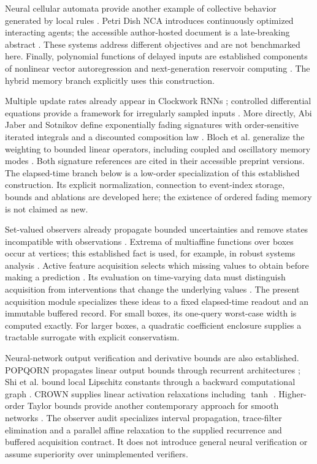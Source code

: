 \documentclass[11pt,a4paper]{article}
\theoremstyle{definition}\newtheorem{definition}[theorem]{Definition}
\begin{document}
Neural cellular automata provide another example of collective behavior generated by local rules \cite{mordvintsev2020}. Petri Dish NCA introduces continuously optimized interacting agents; the accessible author-hosted document is a late-breaking abstract \cite{zhang2025}. These systems address different objectives and are not benchmarked here. Finally, polynomial functions of delayed inputs are established components of nonlinear vector autoregression and next-generation reservoir computing \cite{gauthier2021}. The hybrid memory branch explicitly uses this construction.

Multiple update rates already appear in Clockwork RNNs \cite{koutnik2014}; controlled differential equations provide a framework for irregularly sampled inputs \cite{kidger2020}. More directly, Abi Jaber and Sotnikov define exponentially fading signatures with order-sensitive iterated integrals and a discounted composition law \cite{abijaber2025}. Bloch et al. generalize the weighting to bounded linear operators, including coupled and oscillatory memory modes \cite{bloch2026}. Both signature references are cited in their accessible preprint versions. The elapsed-time branch below is a low-order specialization of this established construction. Its explicit normalization, connection to event-index storage, bounds and ablations are developed here; the existence of ordered fading memory is not claimed as new.

Set-valued observers already propagate bounded uncertainties and remove states incompatible with observations \cite{khajenejad2020}. Extrema of multiaffine functions over boxes occur at vertices; this established fact is used, for example, in robust systems analysis \cite{blanchini2022}. Active feature acquisition selects which missing values to obtain before making a prediction \cite{shim2018}. Its evaluation on time-varying data must distinguish acquisition from interventions that change the underlying values \cite{vonkleist2025}. The present acquisition module specializes these ideas to a fixed elapsed-time readout and an immutable buffered record. For small boxes, its one-query worst-case width is computed exactly. For larger boxes, a quadratic coefficient enclosure supplies a tractable surrogate with explicit conservatism.

Neural-network output verification and derivative bounds are also established. POPQORN propagates linear output bounds through recurrent architectures \cite{ko2019}; Shi et al. bound local Lipschitz constants through a backward computational graph \cite{shi2022}. CROWN supplies linear activation relaxations including $\tanh$ \cite{zhang2018crown}. Higher-order Taylor bounds provide another contemporary approach for smooth networks \cite{entesari2026}. The observer audit specializes interval propagation, trace-filter elimination and a parallel affine relaxation to the supplied recurrence and buffered acquisition contract. It does not introduce general neural verification or assume superiority over unimplemented verifiers.
\end{document}
